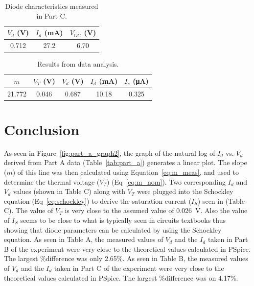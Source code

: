 \documentclass{article}
\begin{document}
%   

\begin{table}[hbtp]
  \centering
  \begin{tabular}{ccc}
    $V_d$ (\si{V}) & $I_d$ (\si{mA}) & $V_{OC}$ (\si{V}) \\
    \hline
    0.712 & 27.2 & 6.70 \\
  \end{tabular}
  \caption{\label{tab:part_c} Diode characteristics measured in Part C.}
\end{table}

\begin{table}[hbtp]
  \centering
  \begin{tabular}{ccccc}
    $m$ & $V_T$ (\si{V}) & $V_d$ (\si{V}) & $I_d$ (\si{mA}) & $I_s$ (\si{\micro\ampere}) \\
    \hline
    21.772 & 0.046 & 0.687 & 10.18 & 0.325 \\
  \end{tabular}
  \caption{\label{tab:analysis} Results from data analysis.}
\end{table}

\section{Conclusion}
\label{sec:conclusion}


As seen in Figure~\ref{fig:part_a_graph2}, the graph of the natural
log of $I_d$ vs. $V_d$ derived from Part A data
(Table~\ref{tab:part_a}) generates a linear plot.  The slope ($m$) of
this line was then calculated using Equation~\ref{eq:m_meas}, and used
to determine the thermal voltage ($V_T$) (Eq~\ref{eq:m_nom}).  Two
corresponding $I_d$ and $V_d$ values (shown in Table C) along with
$V_T$ were plugged into the Schockley equation (Eq~\ref{eq:schockley})
to derive the saturation current ($I_S$) seen in (Table C).  The value
of $V_T$ is very close to the assumed value of \SI{0.026}{V}.  Also
the value of $I_S$ seems to be close to what is typically seen in
circuits textbooks thus showing that diode parameters can be
calculated by using the Schockley equation.  As seen in Table A, the
measured values of $V_d$ and the $I_d$ taken in Part B of the
experiment were very close to the theoretical values calculated in
PSpice. The largest \%difference was only 2.65\%.  As seen in Table B,
the measured values of $V_d$ and the $I_d$ taken in Part C of the
experiment were very close to the theoretical values calculated in
PSpice. The largest \%difference was on 4.17\%.
\end{document}
